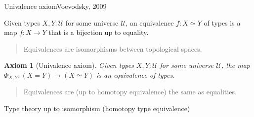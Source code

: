 \documentclass[english]{beamer}
\newtheorem{axiom}[theorem]{Axiom}
\begin{document}





\begin{frame}{Univalence axiom}{Voevodsky, 2009}


\begin{definition}
 Given types $X,Y : \mathcal{U}$ for some universe $\mathcal{U}$, an equivalence $f: X \simeq Y $ of types is a map $f : X \rightarrow Y$ that is a bijection up to equality.
\end{definition}

\begin{quotation}
Equivalences are isomorphisms between topological spaces.
\end{quotation}

\begin{axiom}[Univalence axiom] 
 Given types $X,Y : \mathcal{U}$ for some universe $\mathcal{U}$, the map \(\Phi_{X,Y}: (X=Y) \rightarrow (X \simeq Y)\) is an equivalence of types. 
\end{axiom}

\begin{quotation}
  Equivalences are (up to homotopy equivalence) the same as equalities.
\end{quotation}

Type theory up to isomorphism (homotopy type equivalence)
\end{frame}
\end{document}
